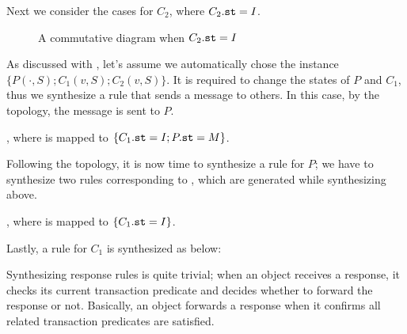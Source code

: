 \documentclass[format=manuscript]{acmart}
\begin{document}
\begin{center}
\end{center}

Next we consider the cases for $C_2$, where $C_2.\texttt{st} = I$.

\begin{figure}[h]
  \caption{A commutative diagram when $C_2.\texttt{st} = I$}
  \label{fig:comm-diagram-status-i}
\end{figure}

As discussed with , let's assume we automatically
chose the instance $\{ P(\cdot, S); C_1(v, S); C_2(v, S) \}$. It is required to
change the states of $P$ and $C_1$, thus we synthesize a rule that sends a
message to others. In this case, by the topology, the message is sent to $P$.

\begin{center}
  , where
   is mapped to $\{ C_1.\texttt{st} = I; P.\texttt{st} = M \}$.
\end{center}

Following the topology, it is now time to synthesize a rule for $P$; we have to
synthesize two rules corresponding to , which are generated
while synthesizing  above.

\begin{center}
  , where
   is mapped to $\{ C_1.\texttt{st} = I \}$.
\end{center}

Lastly, a rule for $C_1$ is synthesized as below:

\begin{center}
\end{center}

Synthesizing response rules is quite trivial; when an object receives a
response, it checks its current transaction predicate and decides whether to
forward the response or not. Basically, an object forwards a response when it
confirms all related transaction predicates are satisfied.
\end{document}
